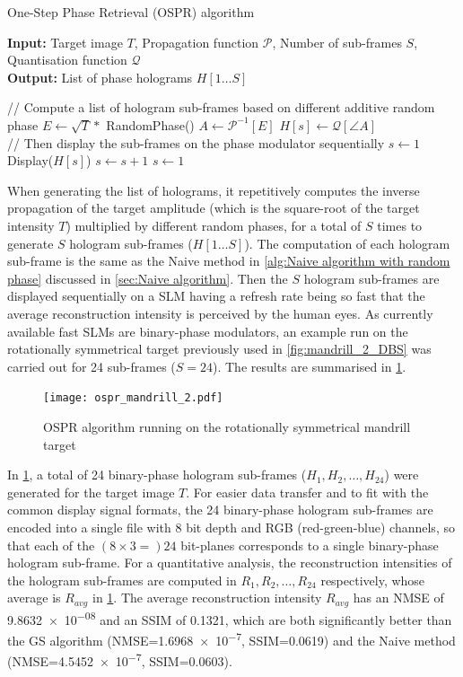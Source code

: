 \begin{algorithm}[H]
  \caption{One-Step Phase Retrieval (OSPR) algorithm}\label{alg:One Step Phase Retrieval (OSPR) Algorithm}
  \textbf{Input:} Target image $T$, Propagation function $\mathcal{P}$, Number of sub-frames $S$, Quantisation function $\mathcal{Q}$\\
  \textbf{Output:} List of phase holograms $H[1\ldots S]$
  \begin{algorithmic}
    \State // Compute a list of hologram sub-frames based on different additive random phase
    \State $E \gets \sqrt{T} * $ RandomPhase()
    \State $A \gets \mathcal{P}^{-1}[E]$
    \State $H[s] \gets \mathcal{Q}[\angle A]$
    \EndFor\\
    \State // Then display the sub-frames on the phase modulator sequentially
    \State $s\gets 1$
    \State Display($H[s]$)
    \State $s\gets s + 1$
    \State $s\gets 1$
    \EndIf
    \EndWhile
  \end{algorithmic}
\end{algorithm}

When generating the list of holograms, it repetitively computes the inverse propagation of the target amplitude (which is the square-root of the target intensity $T$) multiplied by different random phases, for a total of $S$ times to generate $S$ hologram sub-frames ($H[1\ldots S]$). The computation of each hologram sub-frame is the same as the Naive method in \cref{alg:Naive algorithm with random phase} discussed in \cref{sec:Naive algorithm}. Then the $S$ hologram sub-frames are displayed sequentially on a SLM having a refresh rate being so fast that the average reconstruction intensity is perceived by the human eyes. As currently available fast SLMs are binary-phase modulators, an example run on the rotationally symmetrical target previously used in \cref{fig:mandrill_2_DBS} was carried out for 24 sub-frames ($S=24$). The results are summarised in \cref{fig:ospr_mandrill_2}.

\begin{figure}[H]
	\centering
	\texttt{[image: ospr\_mandrill\_2.pdf]}
	\caption{OSPR algorithm running on the rotationally symmetrical mandrill target}
	\label{fig:ospr_mandrill_2}
\end{figure}

In \cref{fig:ospr_mandrill_2}, a total of 24 binary-phase hologram sub-frames ($H_1, H_2, \ldots, H_{24}$) were generated for the target image $T$. For easier data transfer and to fit with the common display signal formats, the 24 binary-phase hologram sub-frames are encoded into a single file with 8 bit depth and RGB (red-green-blue) channels, so that each of the $(8\times 3 = )24$ bit-planes corresponds to a single binary-phase hologram sub-frame. For a quantitative analysis, the reconstruction intensities of the hologram sub-frames are computed in $R_1, R_2, \ldots, R_{24}$ respectively, whose average is $R_{avg}$ in \cref{fig:ospr_mandrill_2}. The average reconstruction intensity $R_{avg}$ has an NMSE of \num{9.8632e-08} and an SSIM of 0.1321, which are both significantly better than the GS algorithm (NMSE=\num{1.6968e-7}, SSIM=0.0619) and the Naive method (NMSE=\num{4.5452e-7}, SSIM=0.0603).

